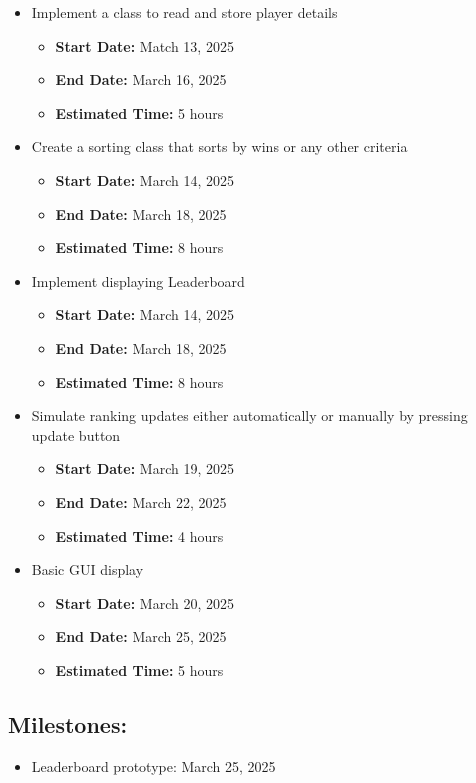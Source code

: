 \documentclass{report}
\begin{document}
\begin{itemize}
    \item Implement a class to read and store player details
    \begin{itemize}
        \item \textbf{Start Date:} Match 13, 2025
        \item \textbf{End Date:} March 16, 2025
        \item \textbf{Estimated Time:} 5 hours
    \end{itemize}
    \item Create a sorting class that sorts by wins or any other criteria
    \begin{itemize}
        \item \textbf{Start Date:} March 14, 2025
        \item \textbf{End Date:} March 18, 2025
        \item \textbf{Estimated Time:} 8 hours
    \end{itemize}
    \item Implement displaying Leaderboard
    \begin{itemize}
        \item \textbf{Start Date:} March 14, 2025
        \item \textbf{End Date:} March 18, 2025
        \item \textbf{Estimated Time:} 8 hours
    \end{itemize}
    \item Simulate ranking updates either automatically or manually by pressing update button
    \begin{itemize}
        \item \textbf{Start Date:} March 19, 2025
        \item \textbf{End Date:} March 22, 2025
        \item \textbf{Estimated Time:} 4 hours
    \end{itemize}
    \item Basic GUI display
    \begin{itemize}
        \item \textbf{Start Date:} March 20, 2025
        \item \textbf{End Date:} March 25, 2025
        \item \textbf{Estimated Time:} 5 hours
    \end{itemize}
\end{itemize}
\subsection*{Milestones:}
\begin{itemize}
    \item Leaderboard prototype: March 25, 2025
\end{itemize}
\end{document}
